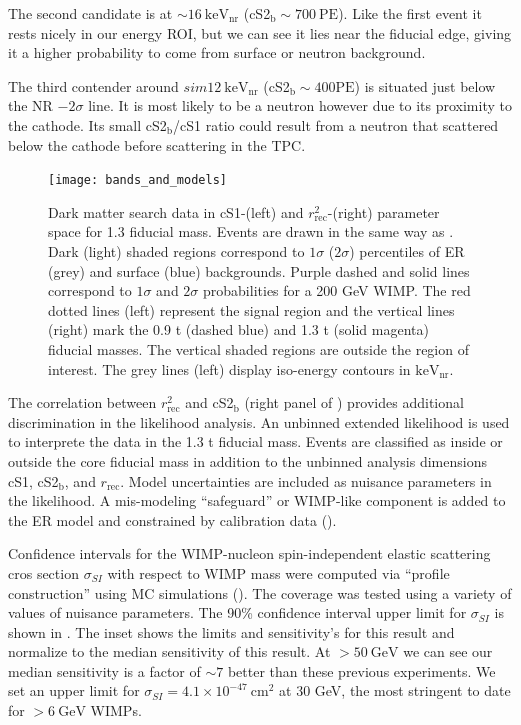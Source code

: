 The second candidate is at ${\sim} 16\ \mathrm{keV_{nr}}$ (cS2$_{\mathrm{b}} \sim 700\ \mathrm{PE}$).  Like the first event it
rests nicely in our energy ROI, but we can see it lies near the fiducial edge, giving it a higher probability to come from surface or
neutron background.

The third contender around ${sim} 12\ \mathrm{keV_{nr}}$ (cS2$_{\mathrm{b}} \sim 400 \mathrm{PE}$) is situated just below the NR
$-2 \sigma$ line.  It is most likely to be a neutron however due to its proximity to the cathode.  Its small cS2$_{\mathrm{b}}$/cS1
ratio could result from a neutron that scattered below the cathode before scattering in the TPC.

\begin{figure}
\centering
\texttt{[image: bands\_and\_models]}
\caption{Dark matter search data in cS1-\cstwob (left) and $r_{\mathrm{rec}}^2$-\cstwob (right) parameter space for 1.3 fiducial
mass.  Events are drawn in the same way as .  Dark (light) shaded regions correspond to
$1 \sigma$ ($2 \sigma$) percentiles of ER (grey) and surface (blue) backgrounds.  Purple dashed and solid lines
correspond to $1 \sigma$ and $2 \sigma$ probabilities for a 200 GeV WIMP.  The red dotted lines (left) represent the signal region
and the vertical lines (right) mark the 0.9 t (dashed blue) and 1.3 t (solid magenta) fiducial masses.  The vertical shaded
regions are outside the region of interest.  The grey lines (left) display iso-energy contours in $\mathrm{keV_{nr}}$.}
\label{fig:dark_matter_results_bands}
\end{figure}

The correlation between $r_{\mathrm{rec}}^2$ and cS2$_{\mathrm{b}}$ (right panel of ) provides
additional discrimination in the likelihood analysis.  An unbinned extended likelihood is used to interprete the data in the 1.3 t
fiducial mass.  Events are classified as inside or outside the core fiducial mass in addition to the unbinned analysis dimensions cS1,
cS2$_{\mathrm{b}}$, and $r_{\mathrm{rec}}$.  Model uncertainties are included as nuisance parameters in the likelihood.  A mis-modeling
``safeguard'' or WIMP-like component is added to the ER model and constrained by  calibration data ().

Confidence intervals for the WIMP-nucleon spin-independent elastic scattering cros section $\sigma_{SI}$ with respect to WIMP mass were
computed via ``profile construction'' using MC simulations
().  The coverage was tested using a variety of values of nuisance parameters.  The 90\% confidence interval upper
limit for $\sigma_{SI}$ is shown in .  The inset shows the limits and sensitivity's for this result
and  normalize to the median sensitivity of this result.  At $> 50\ \mathrm{GeV}$ we can see our median
sensitivity is a factor of ${\sim}7$ better than these previous experiments.  We set an upper limit for
$\sigma_{SI} = 4.1 \times 10^{-47}\ \mathrm{cm^2}$ at 30 GeV, the most stringent to date for $> 6\ \mathrm{GeV}$ WIMPs.

